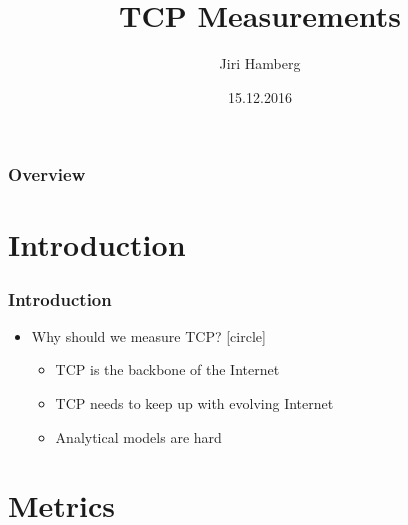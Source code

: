 \documentclass{beamer}
\title[TCP Measurements]{TCP Measurements} %
\author{Jiri Hamberg} %
\institute[Uni.Helsinki] %
{
University of Helsinki \\ %
\medskip
\textit{jiri.hamberg@cs.helsinki.fi} %
}
\date{15.12.2016} %
\begin{document}
\begin{frame}
\titlepage %
\end{frame}

\begin{frame}
\frametitle{Overview} %
\tableofcontents %
\end{frame}


\section{Introduction} 

\begin{frame}
\frametitle{Introduction}

\begin{itemize}
	\item Why should we measure TCP?
	[circle]	
	\begin{itemize}
		\item TCP is the backbone of the Internet
		
		\item TCP needs to keep up with evolving Internet
		
		\item Analytical models are hard 
	\end{itemize}
\end{itemize}

\end{frame}


\section{Metrics}
\end{document}
